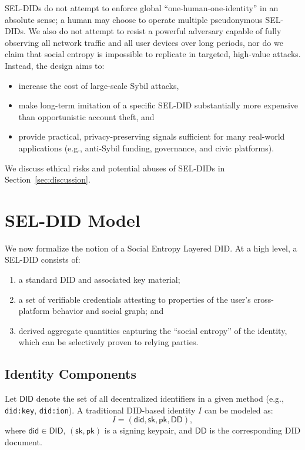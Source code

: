 \documentclass[11pt]{article}
\begin{document}
SEL-DIDs do not attempt to enforce global ``one-human-one-identity'' in an absolute sense; a human may choose to operate multiple pseudonymous SEL-DIDs. We also do not attempt to resist a powerful adversary capable of fully observing all network traffic and all user devices over long periods, nor do we claim that social entropy is impossible to replicate in targeted, high-value attacks. Instead, the design aims to:

\begin{itemize}
  \item increase the cost of large-scale Sybil attacks,
  \item make long-term imitation of a specific SEL-DID substantially more expensive than opportunistic account theft, and
  \item provide practical, privacy-preserving signals sufficient for many real-world applications (e.g., anti-Sybil funding, governance, and civic platforms).
\end{itemize}

We discuss ethical risks and potential abuses of SEL-DIDs in Section~\ref{sec:discussion}.

\section{SEL-DID Model}
\label{sec:model}

We now formalize the notion of a Social Entropy Layered DID. At a high level, a SEL-DID consists of:

\begin{enumerate}
  \item a standard DID and associated key material;
  \item a set of verifiable credentials attesting to properties of the user's cross-platform behavior and social graph; and
  \item derived aggregate quantities capturing the ``social entropy'' of the identity, which can be selectively proven to relying parties.
\end{enumerate}
\subsection{Identity Components}

Let $\mathsf{DID}$ denote the set of all decentralized identifiers in a given method (e.g., \texttt{did:key}, \texttt{did:ion}). A traditional DID-based identity $I$ can be modeled as:
\[
  I = (\mathsf{did}, \mathsf{sk}, \mathsf{pk}, \mathsf{DD}),
\]
where $\mathsf{did} \in \mathsf{DID}$, $(\mathsf{sk}, \mathsf{pk})$ is a signing keypair, and $\mathsf{DD}$ is the corresponding DID document.
\end{document}
